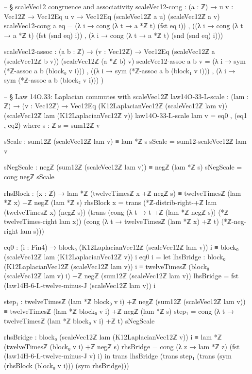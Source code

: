\documentclass[11pt,a4paper]{book}
\begin{document}
\begin{code}
-- § scaleVec12 congruence and associativity
scaleVec12-cong : (a : ℤ) → {u v : Vec12ℤ} → Vec12Eq u v → Vec12Eq (scaleVec12ℤ a u) (scaleVec12ℤ a v)
scaleVec12-cong a eq =
  (λ i → cong (λ t → a *ℤ t) (fst eq i)) ,
  ((λ i → cong (λ t → a *ℤ t) (fst (snd eq) i)) ,
   (λ i → cong (λ t → a *ℤ t) (snd (snd eq) i)))

scaleVec12-assoc : (a b : ℤ) → (v : Vec12ℤ) → Vec12Eq (scaleVec12ℤ a (scaleVec12ℤ b v)) (scaleVec12ℤ (a *ℤ b) v)
scaleVec12-assoc a b v =
  (λ i → sym (*ℤ-assoc a b (block₀ v i))) ,
  ((λ i → sym (*ℤ-assoc a b (block₁ v i))) ,
   (λ i → sym (*ℤ-assoc a b (block₂ v i)))
  )

-- § Law 14O.33: Laplacian commutes with scaleVec12ℤ
law14O-33-L-scale : (lam : ℤ) → (v : Vec12ℤ) →
  Vec12Eq (K12LaplacianVec12ℤ (scaleVec12ℤ lam v)) (scaleVec12ℤ lam (K12LaplacianVec12ℤ v))
law14O-33-L-scale lam v = eq0 , (eq1 , eq2)
  where
    s : ℤ
    s = sum12ℤ v

    sScale : sum12ℤ (scaleVec12ℤ lam v) ≡ lam *ℤ s
    sScale = sum12-scaleVec12ℤ lam v

    sNegScale : negℤ (sum12ℤ (scaleVec12ℤ lam v)) ≡ negℤ (lam *ℤ s)
    sNegScale = cong negℤ sScale

    rhsBlock : (x : ℤ) →
      lam *ℤ (twelveTimesℤ x +ℤ negℤ s) ≡ twelveTimesℤ (lam *ℤ x) +ℤ negℤ (lam *ℤ s)
    rhsBlock x =
      trans
        (*ℤ-distrib-right-+ℤ lam (twelveTimesℤ x) (negℤ s))
        (trans
          (cong (λ t → t +ℤ (lam *ℤ negℤ s)) (*ℤ-twelveTimes-right lam x))
          (cong (λ t → twelveTimesℤ (lam *ℤ x) +ℤ t) (*ℤ-neg-right lam s)))

    eq0 : (i : Fin4) → block₀ (K12LaplacianVec12ℤ (scaleVec12ℤ lam v)) i ≡ block₀ (scaleVec12ℤ lam (K12LaplacianVec12ℤ v)) i
    eq0 i =
      let
        lhsBridge : block₀ (K12LaplacianVec12ℤ (scaleVec12ℤ lam v)) i ≡
                    twelveTimesℤ (block₀ (scaleVec12ℤ lam v) i) +ℤ negℤ (sum12ℤ (scaleVec12ℤ lam v))
        lhsBridge = fst (law14H-6-L-twelve-minus-J (scaleVec12ℤ lam v)) i

        step₁ :
          twelveTimesℤ (lam *ℤ block₀ v i) +ℤ negℤ (sum12ℤ (scaleVec12ℤ lam v))
            ≡
          twelveTimesℤ (lam *ℤ block₀ v i) +ℤ negℤ (lam *ℤ s)
        step₁ = cong (λ t → twelveTimesℤ (lam *ℤ block₀ v i) +ℤ t) sNegScale

        rhsBridge : block₀ (scaleVec12ℤ lam (K12LaplacianVec12ℤ v)) i ≡
                    lam *ℤ (twelveTimesℤ (block₀ v i) +ℤ negℤ s)
        rhsBridge = cong (λ z → lam *ℤ z) (fst (law14H-6-L-twelve-minus-J v) i)
      in
      trans lhsBridge (trans step₁ (trans (sym (rhsBlock (block₀ v i))) (sym rhsBridge)))


\end{code}
\end{document}
